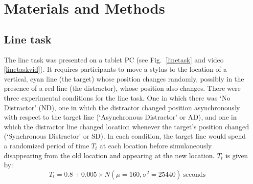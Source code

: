 \documentclass[10pt,letterpaper]{article}
\begin{document}
\section*{Materials and Methods}
\subsection*{Line task}

The line task was presented on a tablet PC (see Fig.~\ref{linetask}
and video \ref{linetaskvid}). It requires participants to move a
stylus to the location of a vertical, cyan line (the target) whose
position changes randomly, possibly in the presence of a red line (the
distractor), whose position also changes. There were three
experimental conditions for the line task. One in which there was `No
Distractor' (ND), one in which the distractor changed position
asynchronously with respect to the target line (`Asynchronous
Distractor' or AD), and one in which the distractor line changed
location whenever the target's position changed (`Synchronous
Distractor' or SD). In each condition, the target line would spend a
randomized period of time $T_t$ at each location before simulaneously
disappearing from the old location and appearing at the new
location. $T_t$ is given by:
%
\begin{equation}\label{eq:tau_target}
  T_t = 0.8 + 0.005 \times N(\mu=160,\sigma^2=25440)~\text{seconds}
\end{equation}
%
%
%
%
%
%
\end{document}
